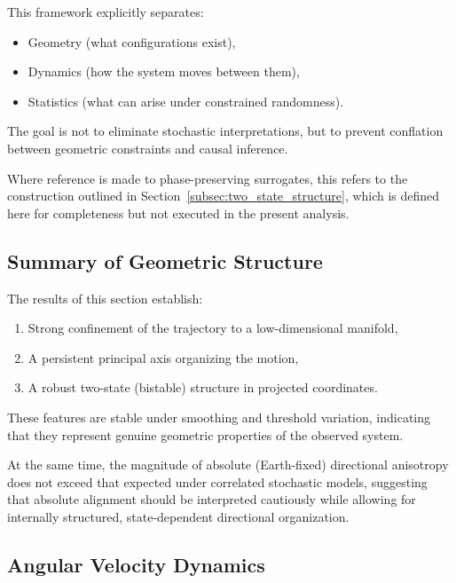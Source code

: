 \documentclass[twocolumn,9pt]{revtex4-2}
\begin{document}
This framework explicitly separates:

\begin{itemize}
\item Geometry (what configurations exist),
\item Dynamics (how the system moves between them),
\item Statistics (what can arise under constrained randomness).
\end{itemize}

The goal is not to eliminate stochastic interpretations,
but to prevent conflation between geometric constraints
and causal inference.

Where reference is made to phase-preserving surrogates, this refers to the construction outlined in Section~\ref{subsec:two_state_structure}, which is defined here for completeness but not executed in the present analysis.

\subsection{Summary of Geometric Structure}
\label{subsec:summary_of_geometric_structure}

The results of this section establish:

\begin{enumerate}
    \item Strong confinement of the trajectory to a low-dimensional manifold,
    \item A persistent principal axis organizing the motion,
    \item A robust two-state (bistable) structure in projected coordinates.
\end{enumerate}

These features are stable under smoothing and threshold variation, indicating that they represent genuine geometric properties of the observed system.

At the same time, the magnitude of absolute (Earth-fixed) directional anisotropy does not exceed that expected under correlated stochastic models, suggesting that absolute alignment should be interpreted cautiously while allowing for internally structured, state-dependent directional organization.

\subsection{Angular Velocity Dynamics}
\label{subsec:angular_velocity_dynamics}
\end{document}
